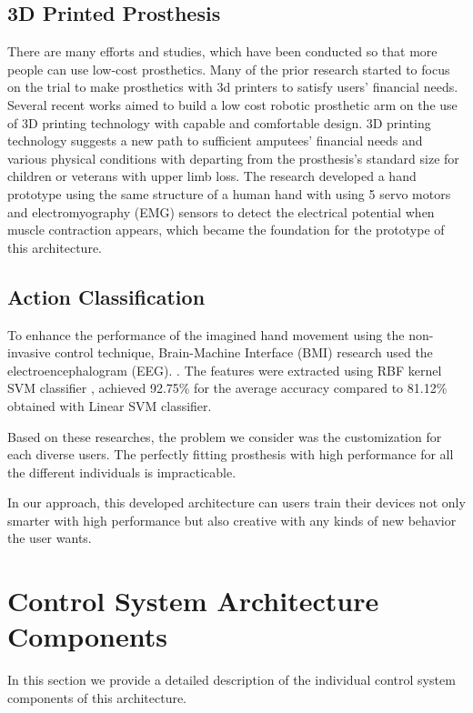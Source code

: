 \documentclass[conference]{IEEEtran}
\begin{document}
\subsection{3D Printed Prosthesis}
There are many efforts and studies, which have been conducted so that more people can use low-cost prosthetics. Many of the prior research started to focus on the trial to make prosthetics with 3d printers to satisfy users' financial needs. Several recent works \cite{3D2}\cite{3D4} aimed to build a low cost robotic prosthetic arm on the use of 3D printing technology with capable and comfortable design. 3D printing technology suggests a new path to sufficient amputees' financial needs and various physical conditions with departing from the prosthesis's standard size for children or veterans with upper limb loss. \cite{3D3} The research \cite{3D1} developed a hand prototype using the same structure of a human hand with using 5 servo motors and electromyography (EMG) sensors to detect the electrical potential when muscle contraction appears, which became the foundation for the prototype of this architecture. 

\subsection{Action Classification}
To enhance the performance of the imagined hand movement using the non-invasive control technique, Brain-Machine Interface (BMI) research used the electroencephalogram (EEG). \cite{EEG}. The features were extracted using RBF kernel SVM classifier \cite{ML1}\cite{ML2}, achieved 92.75\% for the average accuracy compared to 81.12\% obtained with Linear SVM classifier. \cite{EEG} 


Based on these researches, the problem we consider was the customization for each diverse users. The perfectly fitting prosthesis with high performance for all the different individuals is impracticable.

In our approach, this developed architecture can users train their devices not only smarter with high performance but also creative with any kinds of new behavior the user wants.


\section{Control System Architecture Components}
In this section we provide a detailed description of the individual control system components of this architecture.
\end{document}
